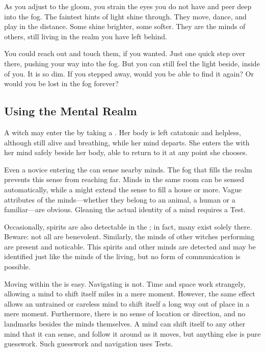 As you adjust to the gloom, you strain the eyes you do not have and peer deep into the fog.
The faintest hints of light shine through.
They move, dance, and play in the distance.
Some shine brighter, some softer.
They are the minds of others, still living in the realm you have left behind.

You could reach out and touch them, if you wanted.
Just one quick step over there, pushing your way into the fog.
But you can still feel the light beside, inside of you.
It is so dim.
If you stepped away, would you be able to find it again?
Or would you be lost in the fog forever?

\subsection{Using the Mental Realm}

A witch may enter the {\mentalrealm} by taking a .
Her body is left catatonic and helpless, although still alive and breathing, while her mind departs.
She enters the {\mentalrealm} with her mind safely beside her body, able to return to it at any point she chooses.

Even a novice entering the {\mentalrealm} can sense nearby minds.
The fog that fills the realm prevents this sense from reaching far.
Minds in the same room can be sensed automatically, while a  might extend the sense to fill a house or more.
Vague attributes of the minds---whether they belong to an animal, a human or a familiar---are obvious.
Gleaning the actual identity of a mind requires a Test.

Occasionally, spirits are also detectable in the {\mentalrealm}; in fact, many exist solely there.
Beware: not all are benevolent.
Similarly, the minds of other witches performing  are present and noticable.
This spirits and other minds are detected and may be identified just like the minds of the living, but no form of communication is possible.

Moving within the {\mentalrealm} is easy.
Navigating is not.
Time and space work strangely, allowing a mind to shift itself miles in a mere moment.
However, the same effect allows an untrained or careless mind to shift itself a long way out of place in a mere moment.
Furthermore, there is no sense of location or direction, and no landmarks besides the minds themselves.
A mind can shift itself to any other mind that it can sense, and follow it around as it moves, but anything else is pure guesswork.
Such guesswork and navigation uses  Tests.

